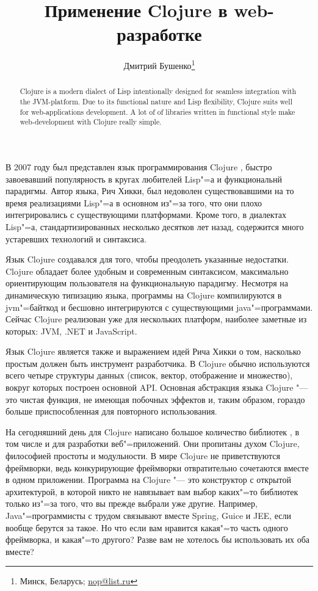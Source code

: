 \documentclass[10pt, a5paper]{article}
\begin{document}
\title{Применение Clojure в web-разработке}%

\author{Дмитрий Бушенко\footnote{Минск, Беларусь; \url{nop@list.ru}}}
\maketitle

\begin{abstract}
Clojure is a modern dialect of Lisp intentionally designed for seamless integration with the JVM-platform. Due to its functional nature and Lisp flexibility, Clojure suits well for web-applications development. A lot of of libraries written in functional style make web-development with Clojure really simple.
\end{abstract}

В 2007 году был представлен язык программирования Clojure \cite{Bushenko1}, быстро завоевавший популярность в кругах любителей Lisp"=а и функциональнй парадигмы. Автор языка, Рич Хикки, был недоволен существовавшими на то время реализациями Lisp"=а в основном из"=за того, что они плохо интегрировались с существующими платформами. Кроме того, в диалектах Lisp"=а, стандартизированных несколько десятков лет назад, содержится много устаревших технологий и синтаксиса.

Язык Clojure создавался для того, чтобы преодолеть указанные недостатки. Clojure обладает более удобным и современным синтаксисом, максимально ориентирующим пользователя на функциональную парадигму. Несмотря на динамическую типизацию языка, программы на Clojure компилируются в jvm"=байткод и бесшовно интегрируются с существующими java"=программами. Сейчас Clojure реализован уже для нескольких платформ, наиболее заметные из которых: JVM, .NET и JavaScript.

Язык Clojure является также и выражением идей Рича Хикки о том, насколько простым должен быть инструмент разработчика. В Clojure обычно используются всего четыре структуры данных (список, вектор, отображение и множество), вокруг которых построен основной API. Основная абстракция языка Clojure "--- это чистая функция, не имеющая побочных эффектов и, таким образом, гораздо больше приспособленная для повторного использования.

На сегодняшний день для Clojure написано большое количество библиотек \cite{Bushenko2}, в том числе и для разработки веб"=приложений. Они пропитаны духом Clojure, философией простоты и модульности. В мире Clojure не приветствуются фреймворки, ведь конкурирующие фреймворки отвратительно сочетаются вместе в одном приложении. Программа на Clojure "--- это конструктор с открытой архитектурой, в которой никто не навязывает вам  выбор каких"=то библиотек только из"=за того, что вы прежде выбрали уже другие. Например, Java"=программисты с трудом связывают вместе Spring, Guice и JEE, если вообще берутся за такое. Но что если вам нравится какая"=то часть одного фреймворка, и какая"=то другого? Разве вам не хотелось бы использовать их оба вместе?
\end{document}
